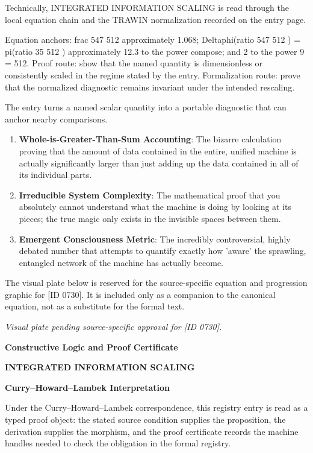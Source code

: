 Technically, INTEGRATED INFORMATION SCALING is read through the local equation chain and the TRAWIN normalization recorded on the entry page.

Equation anchors: frac 547 512 approximately 1.068; Deltaphi(ratio 547 512 ) = pi(ratio 35 512 ) approximately 12.3 to the power compose; and 2 to the power 9 = 512. Proof route: show that the named quantity is dimensionless or consistently scaled in the regime stated by the entry. Formalization route: prove that the normalized diagnostic remains invariant under the intended rescaling.

The entry turns a named scalar quantity into a portable diagnostic that can anchor nearby comparisons.
\endgroup

\begin{enumerate}[leftmargin=1.6em,itemsep=6pt,topsep=4pt]
\item \textbf{Whole-is-Greater-Than-Sum Accounting}: The bizarre calculation proving that the amount of data contained in the entire, unified machine is actually significantly larger than just adding up the data contained in all of its individual parts.
\item \textbf{Irreducible System Complexity}: The mathematical proof that you absolutely cannot understand what the machine is doing by looking at its pieces; the true magic only exists in the invisible spaces between them.
\item \textbf{Emergent Consciousness Metric}: The incredibly controversial, highly debated number that attempts to quantify exactly how 'aware' the sprawling, entangled network of the machine has actually become.
\end{enumerate}

\begingroup\footnotesize\sloppy
The visual plate below is reserved for the source-specific equation and progression graphic for [ID 0730]. It is included only as a companion to the canonical equation, not as a substitute for the formal text.
\par\endgroup
\begingroup\footnotesize\itshape
Visual plate pending source-specific approval for [ID 0730].
\par\endgroup

\clearpage
\begingroup\tzpsupportsetup
\noindent\textbf{\fontsize{10.8pt}{12.8pt}\selectfont [ID 0730] Constructive Logic and Proof Certificate}\par
\noindent\textbf{\fontsize{10pt}{12pt}\selectfont INTEGRATED INFORMATION SCALING}\par
\vspace{0.45em}
\begingroup
\footnotesize
\setlength{\parskip}{0.22em}
\setlength{\parindent}{0pt}
\noindent\textbf{Curry--Howard--Lambek Interpretation}\par
Under the Curry--Howard--Lambek correspondence, this registry entry is read as a typed proof
object: the stated source condition supplies the proposition, the derivation supplies the
morphism, and the proof certificate records the machine handles needed to check the obligation
in the formal registry.

